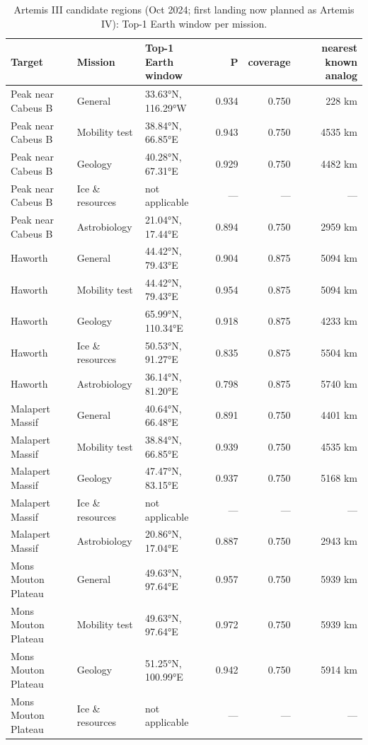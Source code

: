 \begin{table}[ht]
\centering\small
\caption{Artemis III candidate regions (Oct 2024; first landing now planned as Artemis IV): Top-1 Earth window per mission.}
\label{tab:artemis}
\begin{tabular}{lllrrr}
\hline
Target & Mission & Top-1 Earth window & P & coverage & nearest known analog \\
\hline
Peak near Cabeus B & General & 33.63°N, 116.29°W & 0.934 & 0.750 & 228 km \\
Peak near Cabeus B & Mobility test & 38.84°N, 66.85°E & 0.943 & 0.750 & 4535 km \\
Peak near Cabeus B & Geology & 40.28°N, 67.31°E & 0.929 & 0.750 & 4482 km \\
Peak near Cabeus B & Ice \& resources & not applicable & — & — & — \\
Peak near Cabeus B & Astrobiology & 21.04°N, 17.44°E & 0.894 & 0.750 & 2959 km \\
Haworth & General & 44.42°N, 79.43°E & 0.904 & 0.875 & 5094 km \\
Haworth & Mobility test & 44.42°N, 79.43°E & 0.954 & 0.875 & 5094 km \\
Haworth & Geology & 65.99°N, 110.34°E & 0.918 & 0.875 & 4233 km \\
Haworth & Ice \& resources & 50.53°N, 91.27°E & 0.835 & 0.875 & 5504 km \\
Haworth & Astrobiology & 36.14°N, 81.20°E & 0.798 & 0.875 & 5740 km \\
Malapert Massif & General & 40.64°N, 66.48°E & 0.891 & 0.750 & 4401 km \\
Malapert Massif & Mobility test & 38.84°N, 66.85°E & 0.939 & 0.750 & 4535 km \\
Malapert Massif & Geology & 47.47°N, 83.15°E & 0.937 & 0.750 & 5168 km \\
Malapert Massif & Ice \& resources & not applicable & — & — & — \\
Malapert Massif & Astrobiology & 20.86°N, 17.04°E & 0.887 & 0.750 & 2943 km \\
Mons Mouton Plateau & General & 49.63°N, 97.64°E & 0.957 & 0.750 & 5939 km \\
Mons Mouton Plateau & Mobility test & 49.63°N, 97.64°E & 0.972 & 0.750 & 5939 km \\
Mons Mouton Plateau & Geology & 51.25°N, 100.99°E & 0.942 & 0.750 & 5914 km \\
Mons Mouton Plateau & Ice \& resources & not applicable & — & — & — \\

\end{tabular}
\end{table}
